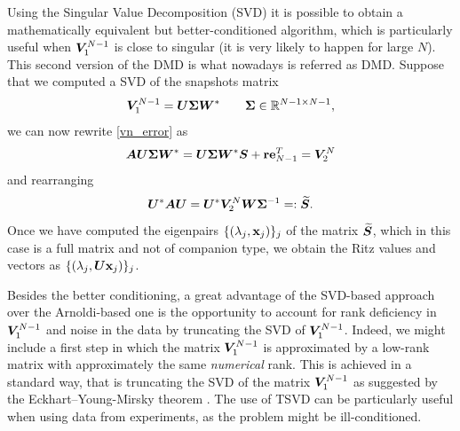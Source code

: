 Using the Singular Value Decomposition (SVD) it is possible to obtain a mathematically equivalent but better-conditioned algorithm, which is particularly useful when $\vb*{V}_1^{N-1}$ is close to singular (it is very likely to happen for large $N$). This second version of the DMD is what nowadays is referred as DMD. Suppose that we computed a SVD of the snapshots matrix
\begin{equation*}
    \vb*{V}_1^{N-1} = \vb*{U}\vb*{\Sigma}\vb*{W}^* \qquad \vb*{\Sigma}\in\mathbb{R}^{N-1\times N-1},
\end{equation*}
we can now rewrite \eqref{vn_error} as
\begin{equation}
    \label{vn_error_rewritten}
    \vb*{A}\vb*{U}\vb*{\Sigma}\vb*{W}^* = \vb*{U}\vb*{\Sigma}\vb*{W}^*\vb*{S} + \vb{r}\vb{e}_{N-1}^T = \vb*{V}_2^N
\end{equation}
and rearranging
\begin{equation}
    \label{S_tilde_definition}
    \vb*{U}^*\vb*{A}\vb*{U} = \vb*{U}^*\vb*{V}_2^N\vb*{W}\vb*{\Sigma}^{-1} =: \widetilde{\vb*{S}}.
\end{equation}
Once we have computed the eigenpairs $\{(\lambda_j, \vb{x}_j)\}_j$ of the matrix $\widetilde{\vb*{S}}$, which in this case is a full matrix and not of companion type, we obtain the Ritz values and vectors as $\{(\lambda_j, \vb*{U}\vb{x}_j)\}_j$. 

Besides the better conditioning, a great advantage of the SVD-based approach over the Arnoldi-based one is the opportunity to account for rank deficiency in $\vb*{V}_1^{N-1}$ and noise in the data by truncating the SVD of $\vb*{V}_1^{N-1}$. Indeed, we might include a first step in which the matrix $\vb*{V}_1^{N-1}$ is approximated by a low-rank matrix with approximately the same \emph{numerical} rank. This is achieved in a standard way, that is truncating the SVD of the matrix $\vb*{V}_1^{N-1}$ as suggested by the Eckhart–Young-Mirsky theorem \cite{golub_matrix_2013}. The use of TSVD can be particularly useful when using data from experiments, as the problem might be ill-conditioned. 

